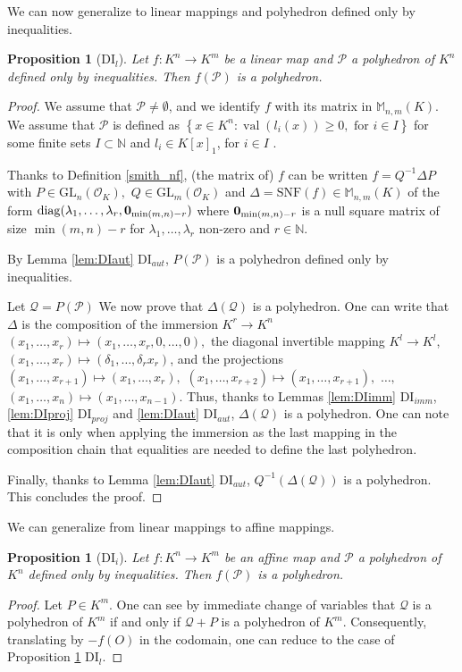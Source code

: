 \documentclass[a4paper,oneside,10pt]{article}
\newtheorem{proposition}[theorem]{Proposition}
\newcommand{\N}{\mathbb{N}} %
\newcommand{\allmat}{\mathbb{M}} %
\newcommand{\PP}{\mathcal{P}}
\newcommand{\Qc}{\mathcal{Q}}
\DeclareMathOperator{\val}{val}
\newcommand{\OK}{\mathcal{O}_K}
\def\diag{\mathrm{diag}}
\newcommand{\GL}{\mathrm{GL}}
\begin{document}
We can now generalize to linear mappings and
polyhedron defined only by inequalities.

\begin{proposition}[DI${}_l$]
Let $f : K^n \to K^m$ be a linear map and $\PP$ a polyhedron of $K^n$ defined only by inequalities.
Then $f(\PP)$ is a polyhedron. \label{prop:DIl}
\end{proposition}
\begin{proof}
We assume that $\PP \neq \emptyset$, and we identify $f$ with its matrix in $\allmat_{n,m}(K)$.
We assume that $\PP$ is defined as $\left\lbrace x \in K^n : \val (l_i (x) ) \geq 0, \textrm{ for } i \in I\right\rbrace$ for some
finite sets $I \subset \N$ and $l_i \in K[x]_1$, for $i \in I$ .

Thanks to Definition \ref{smith_nf}, (the matrix of) $f$
can be written $f=Q^{-1} \Delta P$
with $P \in \GL_n(\OK),$ $Q \in \GL_m(\OK)$
and $\Delta = \mathrm{SNF}(f)\in \allmat_{n,m}(K)$ of the form $\diag(\lambda_1, \ldots, \lambda_r, {\bf 0}_{\min(m,n)-r})$
  where ${\bf 0}_{\min(m,n)-r}$ is a null square matrix of size $\min(m,n)-r$ for $\lambda_1,\dots,\lambda_r$ non-zero and $r \in \N.$

By Lemma \ref{lem:DIaut} DI${}_{aut}$,
$P(\PP)$ is a polyhedron defined only by inequalities.

Let $\Qc= P(\PP)$
We now prove that $\Delta (\Qc)$ is a polyhedron.
One can write that $\Delta$ is the composition
of the immersion 
$K^r \rightarrow K^n$
$(x_1,\dots,x_r)\mapsto (x_1,\dots,x_r,0,\dots,0),$ 
 the diagonal invertible mapping
$K^l \rightarrow K^l$,
$(x_1,\dots,x_r)\mapsto (\delta_1,\dots,\delta_r x_r)$,
and the projections
$(x_1,\dots,x_{r+1})\mapsto (x_1,\dots,x_{r}),$
 $(x_1,\dots,x_{r+2})\mapsto (x_1,\dots,x_{r+1}),$
 $\dots,$
 $(x_1,\dots,x_{n})\mapsto (x_1,\dots,x_{n-1}).$
 Thus, thanks to Lemmas \ref{lem:DIimm} DI${}_{imm}$, \ref{lem:DIproj} DI${}_{proj}$ and \ref{lem:DIaut} DI${}_{aut}$, $\Delta (\Qc)$ is a polyhedron.
 One can note that it is only when applying the immersion as the last mapping in the composition chain that equalities are needed to define the last polyhedron.



Finally, thanks to Lemma \ref{lem:DIaut} DI${}_{aut}$,
$Q^{-1} \left( \Delta (\Qc) \right)$ is a polyhedron.
This concludes the proof.
\end{proof}

We can generalize from linear mappings to affine mappings.
\begin{proposition}[DI${}_i$]
Let $f : K^n \to K^m$ be an affine map and $\PP$ a polyhedron of $K^n$ defined only by inequalities.
Then $f(\PP)$ is a polyhedron. \label{prop:DIi}
\end{proposition}
\begin{proof}
Let $P \in K^m$. One can see by immediate change of variables that $\Qc$ is a polyhedron of $K^m$ if and only if
$\Qc+P$ is a polyhedron of $K^m$.
Consequently, translating by $-f(O)$ in the codomain, one can reduce
to the case of Proposition \ref{prop:DIl}   DI${}_l$.
\end{proof}
\end{document}
